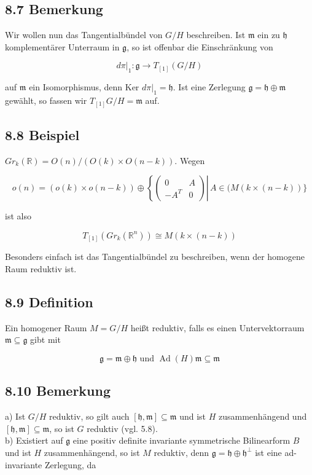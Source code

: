 \documentclass[10pt, letterpaper]{article}
\begin{document}
\subsection*{8.7 Bemerkung}
Wir wollen nun das Tangentialbündel von $G / H$ beschreiben. Ist $\mathfrak{m}$ ein zu $\mathfrak{h}$ komplementärer Unterraum in $\mathfrak{g}$, so ist offenbar die Einschränkung von

$$
\left.d \pi\right|_{1}: \mathfrak{g} \rightarrow T_{[1]}(G / H)
$$

auf $\mathfrak{m}$ ein Isomorphismus, denn Ker $\left.d \pi\right|_{1}=\mathfrak{h}$. Ist eine Zerlegung $\mathfrak{g}=\mathfrak{h} \oplus \mathfrak{m}$ gewählt, so fassen wir $T_{[1]} G / H=\mathfrak{m}$ auf.

\subsection*{8.8 Beispiel}
$G r_{k}(\mathbb{R})=O(n) /(O(k) \times O(n-k))$. Wegen

$$
o(n)=(o(k) \times o(n-k)) \oplus\left\{\left.\left(\begin{array}{cc}
0 & A \\
-A^{T} & 0
\end{array}\right) \right\rvert\, A \in(M(k \times(n-k))\}\right.
$$

ist also

$$
T_{[1]}\left(G r_{k}\left(\mathbb{R}^{n}\right)\right) \cong M(k \times(n-k))
$$

Besonders einfach ist das Tangentialbündel zu beschreiben, wenn der homogene Raum reduktiv ist.

\subsection*{8.9 Definition}
Ein homogener Raum $M=G / H$ heißt reduktiv, falls es einen Untervektorraum $\mathfrak{m} \subseteq \mathfrak{g}$ gibt mit

$$
\mathfrak{g}=\mathfrak{m} \oplus \mathfrak{h} \text { und } \operatorname{Ad}(H) \mathfrak{m} \subseteq \mathfrak{m}
$$

\subsection*{8.10 Bemerkung}
a) Ist $G / H$ reduktiv, so gilt auch $[\mathfrak{h}, \mathfrak{m}] \subseteq \mathfrak{m}$ und ist $H$ zusammenhängend und $[\mathfrak{h}, \mathfrak{m}] \subseteq \mathfrak{m}$, so ist $G$ reduktiv (vgl. 5.8).\\
b) Existiert auf $\mathfrak{g}$ eine positiv definite invariante symmetrische Bilinearform $B$ und ist $H$ zusammenhängend, so ist $M$ reduktiv, denn $\mathfrak{g}=\mathfrak{h} \oplus \mathfrak{h}^{\perp}$ ist eine ad-invariante Zerlegung, da
\end{document}
